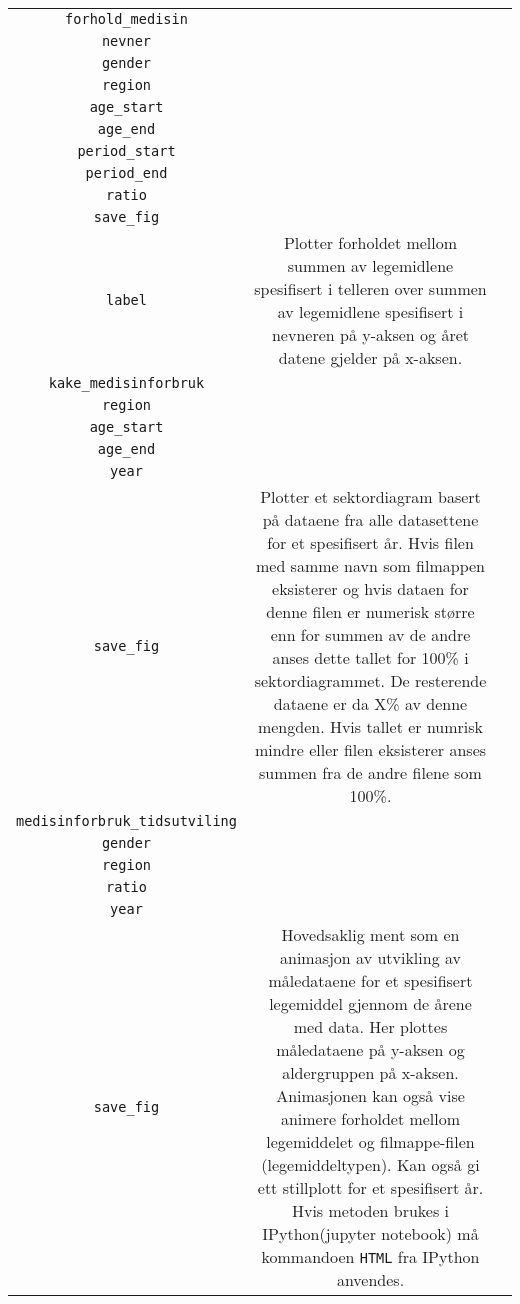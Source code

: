 \documentclass[12pt,norsk,a4paper,fleqn]{article}
\numberwithin{equation}{section}
\begin{document}
{\begin{longtable}[l]{c|c|m{75mm}}
{\color{blue}\texttt{forhold\_medisin}} & 
\color{red}\makecell{{\texttt{teller}\\\texttt{nevner}\\\texttt{gender}\\ \texttt{region}\\ \texttt{age\_start}\\ \texttt{age\_end}\\ \texttt{period\_start}\\ \texttt{period\_end}\\ \texttt{ratio}\\ \texttt{save\_fig}\\ \texttt{label}}} &  Plotter forholdet mellom summen av legemidlene spesifisert i telleren over summen av legemidlene spesifisert i nevneren på y-aksen og året datene gjelder på x-aksen.\\ \hline

{\color{blue}\texttt{kake\_medisinforbruk}} & 
\color{red}\makecell{{\texttt{gender}\\ \texttt{region}\\ \texttt{age\_start}\\ \texttt{age\_end}\\ \texttt{year}\\ \texttt{save\_fig}}} & Plotter et sektordiagram basert på dataene fra alle datasettene for et spesifisert år. Hvis filen med samme navn som filmappen eksisterer og hvis dataen for denne filen er numerisk større enn for summen av de andre anses dette tallet for 100\% i sektordiagrammet. De resterende dataene er da X\% av denne mengden. Hvis tallet er numrisk mindre eller filen eksisterer anses summen fra de andre filene som 100\%.\\ \hline

{\color{blue}\texttt{medisinforbruk\_tidsutviling}} & 
\color{red}\makecell{{\texttt{drug}\\\texttt{gender}\\ \texttt{region}\\ \texttt{ratio}\\ \texttt{year}\\\texttt{save\_fig}}} & Hovedsaklig ment som en animasjon av utvikling av måledataene for et spesifisert legemiddel gjennom de årene med data. Her plottes måledataene på y-aksen og aldergruppen på x-aksen. Animasjonen kan også vise animere forholdet mellom legemiddelet og filmappe-filen (legemiddeltypen). Kan også gi ett stillplott for et spesifisert år. Hvis metoden brukes i IPython(jupyter notebook) må kommandoen \texttt{HTML} fra IPython anvendes.\\ \hline


\end{longtable}}
\end{document}
